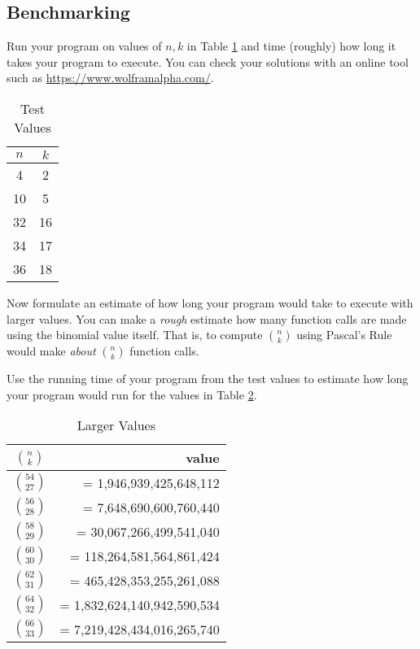 \documentclass[12pt]{scrartcl}
\begin{document}
\subsection*{Benchmarking}

Run your program on values of $n, k$ in Table \ref{table:easyValues} 
and time (roughly) how long it takes your program to execute.  You
can check your solutions with an online tool such as 
\url{https://www.wolframalpha.com/}.

\begin{table}[ht]
\centering
\begin{tabular}{c|c}
$n$ & $k$ \\
\hline\hline
4 & 2 \\
10 & 5 \\
32 & 16 \\  %
34 & 17 \\  %
36 & 18 \\ %
\end{tabular}
\caption{Test Values}
\label{table:easyValues}
\end{table}

Now formulate an estimate of how long your program would take to 
execute with larger values.  You can make a \emph{rough} estimate 
how many function calls are made using the binomial value itself.  
That is, to compute ${n \choose k}$ using Pascal's Rule would make 
\emph{about} ${n \choose k}$ function calls.

Use the running time of your program from the test values to 
estimate how long your program would run for the values in 
Table \ref{table:hardValues}.

\begin{table}[ht]
\centering
\begin{tabular}{c|r}
${n \choose k}$ &  value \\
\hline\hline
${54 \choose 27}$ & =     1,946,939,425,648,112 \\
${56 \choose 28}$ & =     7,648,690,600,760,440 \\
${58 \choose 29}$ & =    30,067,266,499,541,040 \\
${60 \choose 30}$ & =   118,264,581,564,861,424 \\
${62 \choose 31}$ & =   465,428,353,255,261,088 \\
${64 \choose 32}$ & = 1,832,624,140,942,590,534 \\
${66 \choose 33}$ & = 7,219,428,434,016,265,740 \\
\end{tabular}
\caption{Larger Values}
\label{table:hardValues}
\end{table}
\end{document}
